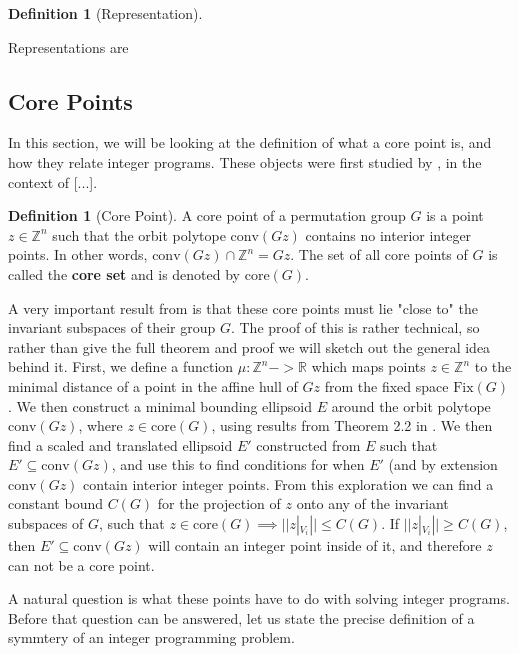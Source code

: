 \documentclass[11pt]{article} %
\theoremstyle{definition}
\newtheorem{definition}[theorem]{Definition}
\theoremstyle{remark}
\newcommand{\ZZ}{\mathbb{Z}}
\newcommand{\RR}{\mathbb{R}}
\begin{document}
\begin{definition} [Representation]

\end{definition}

Representations are 
\subsection{Core Points}

In this section, we will be looking at the definition of what a core point is, and how they relate integer programs. These objects were first studied by \cite{some}, in the context of [...].

\begin{definition}[Core Point]
A core point of a permutation group $G$ is a point $z \in \mathbb{Z}^n$ such that the orbit polytope $\textrm{conv}(Gz)$ contains no interior integer points. In other words, $\textrm{conv}(Gz) \cap \mathbb{Z}^n = Gz$. The set of all core points of $G$ is called the \textbf{core set} and is denoted by $\textrm{core}(G)$.
\end{definition}

A very important result from \cite{rehn} is that these core points must lie "close to" the invariant subspaces of their group $G$. The proof of this is rather technical, so rather than give the full theorem and proof we will sketch out the general idea behind it. First, we define a function $\mu : \ZZ^n -> \RR$ which maps points $z \in \ZZ^n$ to the minimal distance of a point in the affine hull of $Gz$ from the fixed space $\textrm{Fix}(G)$. We then construct a minimal bounding ellipsoid $E$ around the orbit polytope $\textrm{conv}(Gz)$, where $z \in \textrm{core}(G)$, using results from Theorem 2.2 in \cite{barvinok/blekherman}. We then find a scaled and translated ellipsoid $E'$ constructed from $E$ such that $E' \subseteq \textrm{conv}(Gz)$, and use this to find conditions for when $E'$ (and by extension $\textrm{conv}(Gz)$ contain interior integer points. From this exploration we can find a constant bound $C(G)$ for the projection of $z$ onto any of the invariant subspaces of $G$, such that $z \in \textrm{core}(G) \implies  ||z|_{V_i}|| \leq C(G)$. If $||z|_{V_i}|| \geq C(G)$, then $E' \subseteq \textrm{conv}(Gz)$ will contain an integer point inside of it, and therefore $z$ can not be a core point.

A natural question is what these points have to do with solving integer programs. Before that question can be answered, let us state the precise definition of a symmtery of an integer programming problem. 
\end{document}
